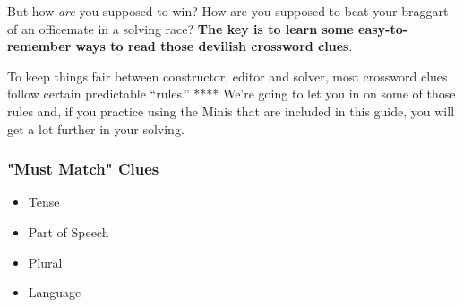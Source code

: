 But how \emph{are} you supposed to win? How are you supposed to beat
your braggart of an officemate in a solving race? \textbf{The key is to
learn some easy-to-remember ways to read those devilish crossword
clues}.~

To keep things fair between constructor, editor and solver, most
crossword clues follow certain predictable ``rules.'' **** We're going
to let you in on some of those rules and, if you practice using the
Minis that are included in this guide, you will get a lot further in
your solving.

\hypertarget{must-match-clues}{%
\subsubsection{"Must Match" Clues}\label{must-match-clues}}

\begin{itemize}
\tightlist
\item
  Tense
\item
  Part of Speech
\item
  Plural
\item
  Language
\end{itemize}

